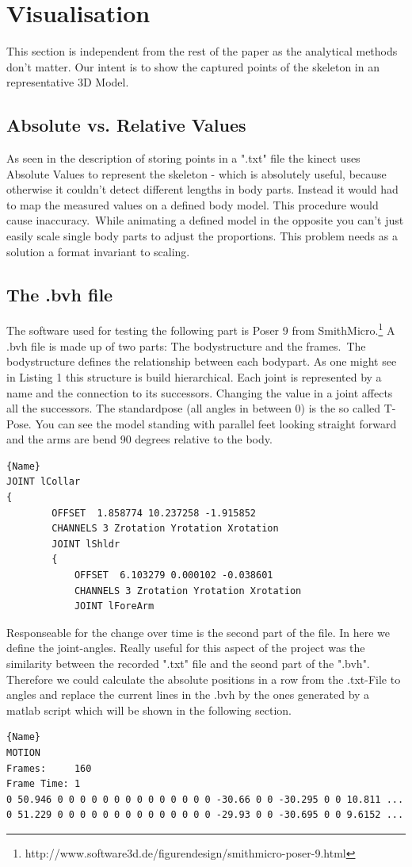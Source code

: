 \documentclass[a4paper]{article}
\begin{document}
\section{Visualisation}

This section is independent from the rest of the paper as the analytical methods don't matter. Our intent is to show the captured points of the skeleton in an representative 3D Model.

\subsection{Absolute vs. Relative Values}
As seen in the description of storing points in a ".txt" file the kinect uses Absolute Values to represent the skeleton  - which is absolutely useful, because otherwise it couldn't detect different lengths in body parts. Instead it would had to map the measured values on a defined body model. This procedure would cause inaccuracy.\
While animating a defined model in the opposite you can't just easily scale single body parts to adjust the proportions. This problem needs as a solution a format invariant to scaling.

\subsection{The .bvh file}
The software used for testing the following part is Poser 9 from SmithMicro.\footnote{http://www.software3d.de/figurendesign/smithmicro-poser-9.html}
A .bvh file is made up of two parts: The bodystructure and the frames.\
The bodystructure defines the relationship between each bodypart. As one might see in
Listing 1 this structure is build hierarchical. Each joint is represented by a name and the connection to its successors. Changing the value in a joint affects all the successors. 
The standardpose (all angles in between 0) is the so called T-Pose. You can see the model standing with parallel feet looking straight forward and the arms are bend 90 degrees relative to the body.
\begin{lstlisting}[caption=.bvh Connected Structure]{Name}
JOINT lCollar
{
		OFFSET	1.858774 10.237258 -1.915852
		CHANNELS 3 Zrotation Yrotation Xrotation
		JOINT lShldr
		{
			OFFSET	6.103279 0.000102 -0.038601
			CHANNELS 3 Zrotation Yrotation Xrotation
			JOINT lForeArm
\end{lstlisting}

Responseable for the change over time is the second part of the file. In here we define the joint-angles. Really useful for this aspect of the project was the similarity between the recorded ".txt" file and the seond part of the ".bvh". Therefore we could calculate the absolute positions in a row from the .txt-File to angles and replace the current lines in the .bvh by the ones generated by a matlab script which will be shown in the following section.
\begin{lstlisting}[caption=Motionpart of .bvh]{Name}
MOTION
Frames:     160
Frame Time: 1                
0 50.946 0 0 0 0 0 0 0 0 0 0 0 0 0 0 -30.66 0 0 -30.295 0 0 10.811 ...
0 51.229 0 0 0 0 0 0 0 0 0 0 0 0 0 0 -29.93 0 0 -30.695 0 0 9.6152 ...
\end{lstlisting}
\end{document}
